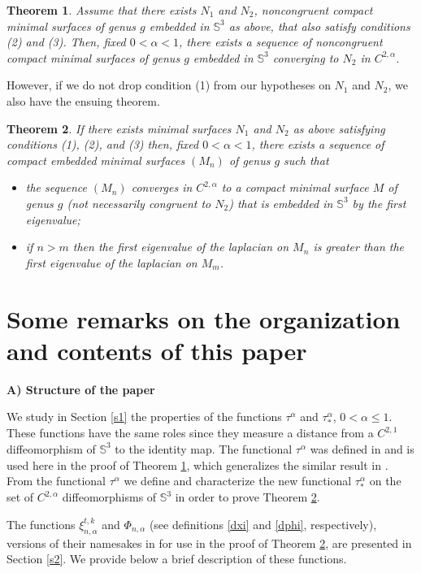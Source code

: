 \documentclass{article}
\def\S3{{\mathbb S^3}}
\newtheorem{theorem}{Theorem}[section]
\begin{document}
 \begin{theorem}\label{tp1} Assume that there exists $N_1$ and $N_2$,   noncongruent compact minimal surfaces of genus $g$ embedded in $\S3$ as above, that also satisfy conditions (2) and (3). Then, fixed $0<\alpha<1$, there exists a sequence of noncongruent compact minimal surfaces of genus $g$ embedded in $\S3$ converging to $N_2$ in $C^{2,\alpha}$.
 \end{theorem}
 
 
However, if we do not drop condition (1) from our hypotheses on $N_1$ and $N_2$, we also have the ensuing theorem. 
 
 \begin{theorem}\label{tp2} If there exists minimal surfaces $N_1$ and $N_2$ as above satisfying conditions (1), (2), and (3) then, fixed $0<\alpha<1$,  there exists a sequence of compact embedded minimal surfaces $(M_n)$ of genus $g$ such that 
\begin{itemize} 
\item[(i)] the sequence $(M_n)$ converges  in $C^{2,\alpha}$ to a compact minimal surface $M$ of genus $g$ (not necessarily congruent to $N_2$) that is embedded in $\S3$ by the first eigenvalue;
\item[(ii)] if $n>m$ then the first eigenvalue of the laplacian on $M_n$ is greater than the first eigenvalue of the laplacian on $M_m$.
\end{itemize}
 \end{theorem}


 \section{Some remarks on the organization  and contents of this paper}\label{sorg}
 
 \noindent
{\bf A) Structure of the paper}\bigskip
 
We  study in Section \ref{s1} the properties of the functions $\tau^\alpha$ and $\tau_*^\alpha$, $0<\alpha\leq 1$. These functions have the same roles since they  measure  a distance from a $C^{2,1}$ diffeomorphism of $\S3$ to the identity map. The functional $\tau^\alpha$  was defined in \cite{p1}  and  is used here in the proof of Theorem \ref{tp1}, which generalizes the similar result in \cite{p1}. From the functional $\tau^\alpha$ we define and characterize the new functional  $\tau_*^\alpha$ on the set of $C^{2,\alpha}$ diffeomorphisms of $\S3$ in order to prove Theorem \ref{tp2}.


The functions $\xi_{n,\alpha}^{t,k}$ and $\Phi_{n,\alpha}$\hspace{.01in} (see definitions \ref{dxi} and \ref{dphi}, respectively), versions of their namesakes in \cite{p1}  for use in the proof of Theorem \ref{tp2}, are presented in Section \ref{s2}. We  provide below a brief description of these functions.
\end{document}
